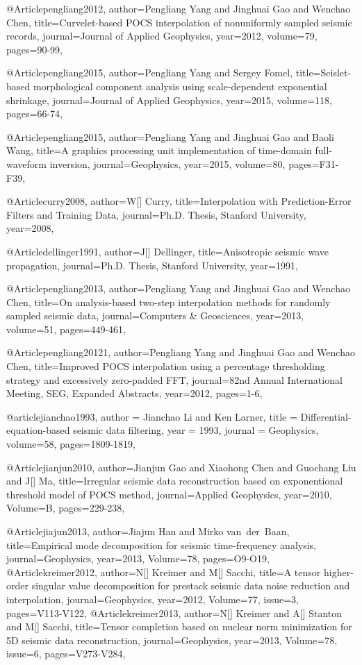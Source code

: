 {@Article{pengliang2012,
  author={Pengliang Yang and Jinghuai Gao and Wenchao Chen},
  title={Curvelet-based {POCS} interpolation of nonuniformly sampled seismic records},
  journal={Journal of Applied Geophysics},
  year=2012,
  volume=79,
  pages={90-99},
}

@Article{pengliang2015,
  author={Pengliang Yang and Sergey Fomel},
  title={Seislet-based morphological component analysis using scale-dependent exponential shrinkage},
  journal={Journal of Applied Geophysics},
  year=2015,
  volume=118,
  pages={66-74},
}

@Article{pengliang2015,
  author={Pengliang Yang and Jinghuai Gao and Baoli Wang},
  title={A graphics processing unit implementation of time-domain full-waveform inversion},
  journal={Geophysics},
  year=2015,
  volume=80,
  pages={F31-F39},
}

@Article{curry2008,
  author={W[] Curry},
  title={Interpolation with Prediction-Error Filters and Training Data},
  journal={Ph.D. Thesis, Stanford University},
  year=2008,
}

@Article{dellinger1991,
  author={J[] Dellinger},
  title={Anisotropic seismic wave propagation},
  journal={Ph.D. Thesis, Stanford University},
  year=1991,
}

@Article{pengliang2013,
  author={Pengliang Yang and Jinghuai Gao and Wenchao Chen},
  title={On analysis-based two-step interpolation methods for randomly sampled seismic data},
  journal={Computers \& Geosciences},
  year=2013,
  volume=51,
  pages={449-461},
}

@Article{pengliang20121,
  author={Pengliang Yang and Jinghuai Gao and Wenchao Chen},
  title={Improved {POCS} interpolation using a percentage thresholding strategy and excessively zero-padded FFT},
  journal={82nd Annual International Meeting, SEG, Expanded Abstracts},
  year=2012,
  pages={1-6},
}

@article{jianchao1993,
  author =	 {Jianchao Li and Ken Larner},
  title =	 {Differential-equation-based seismic data filtering},
  year =	 1993,
  journal =	 {Geophysics},
  volume={58},
 pages=1809-1819,
}

@Article{jianjun2010,
  author={Jianjun Gao and Xiaohong Chen and Guochang Liu and J[] Ma},
  title={Irregular seismic data reconstruction based on exponentional threshold model of {POCS} method},
  journal={Applied Geophysics},
  year=2010,
  Volume=B,
  pages={229-238},
}

@Article{jiajun2013,
  author={Jiajun Han and Mirko van~der~Baan},
  title={Empirical mode decomposition for seismic time-frequency analysis},
  journal={Geophysics},
  year=2013,
  Volume=78,
  pages={O9-O19},
}
@Article{kreimer2012,
  author={N[] Kreimer and M[] Sacchi},
  title={A tensor higher-order singular value decomposition for prestack seismic data noise reduction and interpolation},
  journal={Geophysics},
  year=2012,
  Volume=77,
  issue=3,
  pages={V113-V122},
}
@Article{kreimer2013,
  author={N[] Kreimer and A[] Stanton and M[] Sacchi},
  title={Tensor completion based on nuclear norm minimization for 5{D} seismic data reconstruction},
  journal={Geophysics},
  year=2013,
  Volume=78,
  issue=6,
  pages={V273-V284},
}

}
